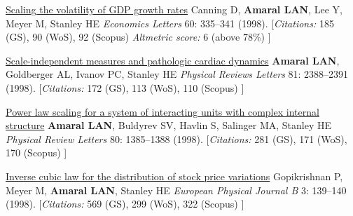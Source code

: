 \NumberedItem{\makebox[0.8cm][r]{[19]}}
\href{/people/amaral/scaling-the-volatility-of-gdp-growth-rates}
{Scaling the volatility of GDP growth rates}
\newline
Canning D, {\textbf{Amaral LAN}}, Lee Y, Meyer M, Stanley HE
\newline
\textit{Economics Letters}
    60:
335--341 (1998).
    \newline
    \hfill [{\em{Citations:}} 185 (GS),
    90 (WoS), 92 (Scopus)
        {\hspace*{1cm} \em{Altmetric score:}}  6 (above 78\%)
    ]
\newline
\Gap
~
\Gap

\NumberedItem{\makebox[0.8cm][r]{[18]}}
\href{/people/amaral/scale-independent-measures-and-pathologic-cardiac-dynamics}
{Scale-independent measures and pathologic cardiac dynamics}
\newline
{\textbf{Amaral LAN}}, Goldberger AL, Ivanov PC, Stanley HE
\newline
\textit{Physical Reviews Letters}
    81:
2388--2391 (1998).
    \newline
    \hfill [{\em{Citations:}} 172 (GS),
    113 (WoS), 110 (Scopus)
    ]
\newline
\Gap
~
\Gap

\NumberedItem{\makebox[0.8cm][r]{[17]}}
\href{/people/amaral/power-law-scaling-for-a-system-of-interacting-units-with-complex-internal-structure}
{Power law scaling for a system of interacting units with complex internal structure}
\newline
{\textbf{Amaral LAN}}, Buldyrev SV, Havlin S, Salinger MA, Stanley HE
\newline
\textit{Physical Review Letters}
    80:
1385--1388 (1998).
    \newline
    \hfill [{\em{Citations:}} 281 (GS),
    171 (WoS), 170 (Scopus)
    ]
\newline
\Gap
~
\Gap

\NumberedItem{\makebox[0.8cm][r]{[16]}}
\href{/people/amaral/inverse-cubic-law-for-the-distribution-of-stock-price-variations}
{Inverse cubic law for the distribution of stock price variations}
\newline
Gopikrishnan P, Meyer M, {\textbf{Amaral LAN}}, Stanley HE
\newline
\textit{European Physical Journal B}
    3:
139--140 (1998).
    \newline
    \hfill [{\em{Citations:}} 569 (GS),
    299 (WoS), 322 (Scopus)
    ]
\newline
\Gap
~
\Gap

